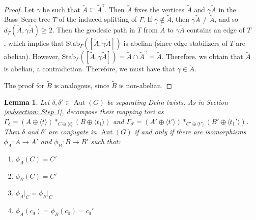 \documentclass{amsart}
\DeclareMathOperator{\Aut}{Aut}
\theoremstyle{plain}
\newtheorem{lemma}[thm]{Lemma}
\theoremstyle{definition}
\theoremstyle{remark}
\begin{document}
\begin{proof}
    
    Let $\gamma$ be such that $\tilde{A} \subseteq \tilde{A}^{\gamma}$. Then $\tilde{A}$ fixes the vertices $\tilde{A}$ and $\gamma \tilde{A}$ in the Bass--Serre tree $T$ of the induced splitting of $\Gamma$. If $\gamma \notin \tilde{A}$, then $\gamma \tilde{A} \neq \tilde{A}$, and so $d_T(\tilde{A}, \gamma \tilde{A}) \geq 2$. Then the geodesic path in $T$ from $\tilde{A}$ to $\gamma \tilde{A}$ contains an edge of $T$, which implies that $\mathrm{Stab}_{\Gamma}([\tilde{A}, \gamma \tilde{A}])$ is abelian (since edge stabilizers of $T$ are abelian). However, $\mathrm{Stab}_{\Gamma}([\tilde{A}, \gamma \tilde{A}]) = \tilde{A} \cap \tilde{A}^{\gamma} = \tilde{A}$. Therefore, we obtain that $\tilde{A}$ is abelian, a contradiction. 
   Therefore, we must have that $\gamma \in \tilde{A}$. 

   The proof for $\tilde{B}$ is analogous, since $\tilde{B}$ is non-abelian. 
\end{proof}

\begin{lemma}
\label{lem:upgrade_to_fiber_preserving}
    Let $\delta, \delta' \in \Aut(G)$ be separating Dehn twists. As in Section \ref{subsection: Step 1}, decompose their mapping tori as $\Gamma_{\delta} =(A \oplus \langle t\rangle) *_{C \oplus \langle t \rangle} (B \oplus \langle t_1 \rangle)$ and $\Gamma_{\delta'} =(A' \oplus \langle t'\rangle) *_{C' \oplus \langle t' \rangle} (B' \oplus \langle t_1' \rangle)$. Then $\delta$ and $\delta'$ are conjugate in $\Aut(G)$ if and only if there are isomorphisms $\phi_A : A \to A'$ and $\phi_B : B \to B'$ such that: 
    
    \begin{enumerate}
        \item $\phi_A(C) = C'$ 
        \item $\phi_B(C) = C'$ 
        \item $\phi_A \vert_C = \phi_B \vert_C$ 
        \item $\phi_A(c_0) = \phi_B(c_0) = c_0'$
    \end{enumerate}
    

\end{lemma}
\end{document}
